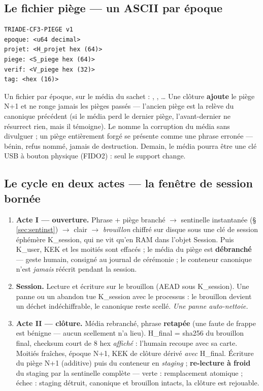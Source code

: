 \subsection{Le fichier piège — un ASCII par époque}

\begin{lstlisting}
TRIADE-CF3-PIEGE v1
epoque: <u64 decimal>
projet: <H_projet hex (64)>
piege: <S_piege hex (64)>
verif: <V_piege hex (32)>
tag: <hex (16)>
\end{lstlisting}

Un fichier par époque, sur le média du sachet : ,
, \ldots{} Une clôture \textbf{ajoute} le piège N+1 et ne ronge jamais
les pièges passés — l'ancien piège est la relève du canonique précédent (si le média
perd le dernier piège, l'avant-dernier ne résurrect rien, mais il témoigne). Le
 nomme la corruption du média sans divulguer ; un piège entièrement forgé se
présente comme une phrase erronée — bénin, refus nommé, jamais de destruction. Demain,
le média pourra être une clé USB à bouton physique (FIDO2) : seul le support change.

\subsection{Le cycle en deux actes — la fenêtre de session bornée}\label{sec:deuxactes}

\begin{enumerate}
\item \textbf{Acte I — ouverture.} Phrase + piège branché $\to$ sentinelle
instantanée (§ \ref{sec:sentinst}) $\to$ clair $\to$ \emph{brouillon} chiffré sur
disque sous une clé de session éphémère K\_session, qui ne vit qu'en RAM dans l'objet
Session. Puis K\_user, KEK et les moitiés sont effacés ; le média du piège est
\textbf{débranché} — geste humain, consigné au journal de cérémonie ; le conteneur
canonique n'est \emph{jamais} réécrit pendant la session.
\item \textbf{Session.} Lecture et écriture sur le brouillon (AEAD sous K\_session).
Une panne ou un abandon tue K\_session avec le processus : le brouillon devient un
déchet indéchiffrable, le canonique reste scellé. \emph{Une panne auto-nettoie.}
\item \textbf{Acte II — clôture.} Média rebranché, phrase \textbf{retapée} (une faute
de frappe est bénigne — aucun scellement n'a lieu). H\_final = sha256 du brouillon
final, checksum court de 8 hex \emph{affiché} : l'humain recoupe avec sa carte. Moitiés
fraîches, époque N+1, KEK de clôture dérivé \emph{avec} H\_final. Écriture du piège
N+1 (additive) puis du conteneur en \emph{staging} ; \textbf{re-lecture à froid} du
staging par la sentinelle complète — verte : remplacement atomique ; échec : staging
détruit, canonique et brouillon intacts, la clôture est rejouable.
\end{enumerate}

